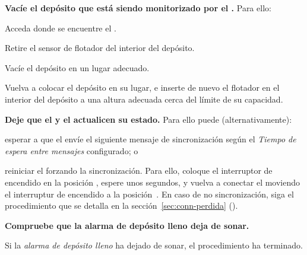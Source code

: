 \begin{enumeratecompact}

\item \textbf{Vacíe el depósito que está siendo monitorizado por el \MEE.} Para ello:

\begin{itemizecompact}

\item Acceda donde se encuentre el \MEE.

\item Retire el sensor de flotador del interior del depósito.

\item Vacíe el depósito en un lugar adecuado.

\item Vuelva a colocar el depósito en su lugar, e inserte de nuevo el flotador en el interior del depósito a una altura adecuada cerca del límite de su capacidad.  

\end{itemizecompact}

\item \textbf{Deje que el \MEE y el \MIE actualicen su estado.} Para ello puede (alternativamente):

\begin{enumeratecompact}
  
\item esperar a que el \MEE envíe el siguiente mensaje de sincronización según el \emph{Tiempo de espera entre mensajes} configurado; o

\item reiniciar el \MEE forzando la sincronización. Para ello, coloque el interruptor de encendido  en la posición \off, espere unos segundos, y vuelva a conectar el \ME moviendo el interruptur de encendido  a la posición~\on. En caso de no sincronización, siga el procedimiento que se detalla en la sección~\ref{sec:conn-perdida} (\textit{}).
  
\end{enumeratecompact}

\item \textbf{Compruebe que la alarma de depósito lleno deja de sonar.} 

\begin{itemizecompact}

\item Si la \emph{alarma de depósito lleno} ha dejado de sonar, el procedimiento ha terminado.


\end{itemizecompact}
\end{enumeratecompact}
